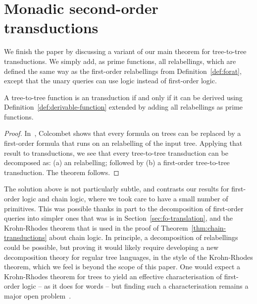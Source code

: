 \section{Monadic second-order transductions}
\label{sec:mso-trans}
We finish the paper by discussing a variant of our main theorem for   \mso tree-to-tree transductions. 
We simply add, as prime functions, all \mso relabellings, which are defined the  same way as the first-order relabellings from Definition~\ref{def:forat}, except that the unary queries can use \mso logic instead of first-order logic. 

\begin{theorem}\label{thm:mso-transductions}
    A tree-to-tree function is an \mso  transduction if and only if it can be derived  using  Definition~\ref{def:derivable-function}  extended by  adding  all \mso relabellings as prime functions. 
\end{theorem}
\begin{proof}
    In~\cite[Corollary 1]{colcombetCombinatorialTheoremTrees2007}, Colcombet shows that every \mso formula on trees can be replaced by a first-order formula that runs on an \mso relabelling of the input tree. Applying that result to transductions, we see that every \mso tree-to-tree transduction can be decomposed as: (a) an \mso relabelling; followed by (b) a first-order tree-to-tree transduction.  The theorem follows.
\end{proof}
The solution above is not particularly subtle, and contrasts our results for  first-order logic and chain logic, where  we took care to have a small number of primitives. This  was possible thanks in part to the decomposition of first-order queries into simpler ones that was is in Section~\ref{sec:fo-translation}, and the Krohn-Rhodes theorem that is used in the proof of Theorem~\ref{thm:chain-transductions} about chain logic.  In principle,  a decomposition of \mso relabellings could be possible, but proving it  would likely require developing a new decomposition  theory for regular tree languages, in the style of the Krohn-Rhodes theorem, which we feel is beyond the scope of this paper. One would expect a Krohn-Rhodes theorem  for trees to yield an effective characterisation of first-order logic -- as it does for words -- but finding such a characterisation remains a major open problem~\cite[Section 3]{bojanczyk2015automata}. 




